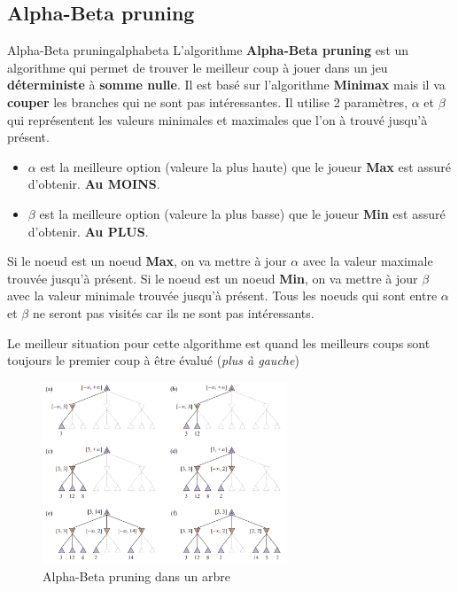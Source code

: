 \subsection{Alpha-Beta pruning} %
\label{sub:alpha_beta_pruning}

\begin{definition}{Alpha-Beta pruning}{alphabeta}
    L'algorithme \textbf{Alpha-Beta pruning} est un algorithme qui permet de trouver le meilleur coup à jouer dans un jeu \textbf{déterministe} à \textbf{somme nulle}.
    Il est basé sur l'algorithme \textbf{Minimax} mais il va \textbf{couper} les branches qui ne sont pas intéressantes.
    Il utilise 2 paramètres, $\alpha$ et $\beta$ qui représentent les valeurs minimales et maximales que l'on à trouvé jusqu'à présent.
    \begin{itemize}
        \item $\alpha$ est la meilleure option (valeure la plus haute) que le joueur \textbf{Max} est assuré d'obtenir. 
            \textbf{Au MOINS}.
        \item $\beta$ est la meilleure option (valeure la plus basse) que le joueur \textbf{Min} est assuré d'obtenir. 
            \textbf{Au PLUS}.
    \end{itemize} 
\end{definition}

Si le noeud est un noeud \textbf{Max}, on va mettre à jour $\alpha$ avec la valeur maximale trouvée jusqu'à présent. 
Si le noeud est un noeud \textbf{Min}, on va mettre à jour $\beta$ avec la valeur minimale trouvée jusqu'à présent. 
Tous les noeuds qui sont entre $\alpha$ et $\beta$ ne seront pas visités car ils ne sont pas intéressants.

\begin{remark}\leavevmode
    Le meilleur situation pour cette algorithme est quand les meilleurs coups sont toujours le 
    premier coup à être évalué (\textit{plus à gauche})
\end{remark}

\begin{figure}[H]
    \begin{center}
        \includegraphics[width=0.65\textwidth]{pictures/alphabeta.png}
    \end{center}
    \caption{Alpha-Beta pruning dans un arbre}\label{fig:alphabeta} 
\end{figure}

